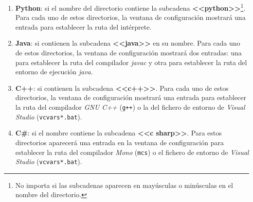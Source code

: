 \documentclass[]{article}
\newcommand{\code}[1]{{\lstinline[basicstyle=\ttfamily,mathescape]!#1!}}
\begin{document}
\begin{enumerate}
  \item \textbf{Python}: si el nombre del directorio contiene la subcadena \textbf{<<python>>}\footnote{No importa si las subcadenas aparecen en mayúsculas o minúsculas en el nombre del directorio.}. Para cada uno de estos directorios, la ventana de configuración mostrará una entrada para establecer la ruta del intérprete.
  \item \textbf{Java}: si contienen la subcadena \textbf{<<java>>} en su nombre. Para cada uno de estos directorios, la ventana de configuración mostrará dos entradas: una para establecer la ruta del compilador \emph{javac} y otra para establecer la ruta del entorno de ejecución \emph{java}.
  \item \textbf{C++}: si contienen la subcadena \textbf{<<c++>>}. Para cada uno de estos directorios, la ventana de configuración mostrará una entrada para establecer la ruta del compilador \emph{GNU C++} (\code{g++}) o la del fichero de entorno de \emph{Visual Studio} (\code{vcvars*.bat}). 
  \item \textbf{C\#}: si el nombre contiene la subcadena \textbf{<<c sharp>>}. Para estos directorios aparecerá una entrada en la ventana de configuración para establecer la ruta del compilador \emph{Mono} (\code{mcs}) o el fichero de entorno de \emph{Visual Studio} (\code{vcvars*.bat}).
\end{enumerate}
\end{document}
